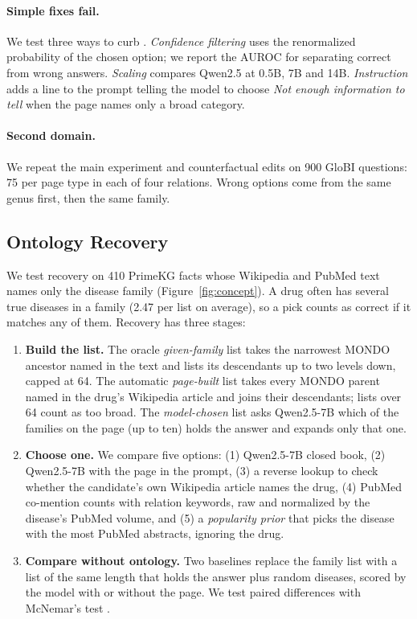 \paragraph{Simple fixes fail.}
We test three ways to curb \clade{}. \emph{Confidence filtering} uses the renormalized probability of the chosen option; we report the AUROC for separating correct from wrong answers. \emph{Scaling} compares Qwen2.5 at 0.5B, 7B and 14B. \emph{Instruction} adds a line to the prompt telling the model to choose \emph{Not enough information to tell} when the page names only a broad category.

\paragraph{Second domain.}
We repeat the main experiment and counterfactual edits on 900 GloBI questions: 75 per page type in each of four relations. Wrong options come from the same genus first, then the same family.

\subsection{Ontology Recovery}

We test recovery on 410 PrimeKG facts whose Wikipedia and PubMed text names only the disease family (Figure~\ref{fig:concept}). A drug often has several true diseases in a family (2.47 per list on average), so a pick counts as correct if it matches any of them. Recovery has three stages:

\begin{enumerate}
\item \textbf{Build the list.} The oracle \emph{given-family} list takes the narrowest MONDO ancestor named in the text and lists its descendants up to two levels down, capped at 64. The automatic \emph{page-built} list takes every MONDO parent named in the drug's Wikipedia article and joins their descendants; lists over 64 count as too broad. The \emph{model-chosen} list asks Qwen2.5-7B which of the families on the page (up to ten) holds the answer and expands only that one.
\item \textbf{Choose one.} We compare five options: (1) Qwen2.5-7B closed book, (2) Qwen2.5-7B with the page in the prompt, (3) a reverse lookup to check whether the candidate's own Wikipedia article names the drug, (4) PubMed co-mention counts with relation keywords, raw and normalized by the disease's PubMed volume, and (5) a \emph{popularity prior} that picks the disease with the most PubMed abstracts, ignoring the drug.
\item \textbf{Compare without ontology.} Two baselines replace the family list with a list of the same length that holds the answer plus random diseases, scored by the model with or without the page. We test paired differences with McNemar's test \citep{mcnemar1947}.
\end{enumerate}


